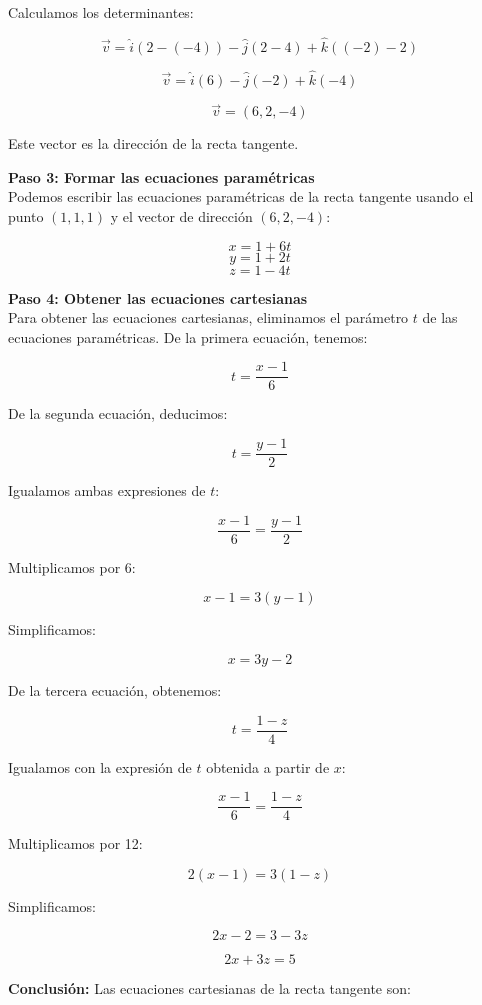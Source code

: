 \documentclass{report}
\begin{document}
    Calculamos los determinantes:

    \[
    \vec{v} = \hat{i} (2 - (-4)) - \hat{j} (2 - 4) + \hat{k} ((-2) - 2)
    \]

    \[
    \vec{v} = \hat{i} (6) - \hat{j} (-2) + \hat{k} (-4)
    \]

    \[
    \vec{v} = (6, 2, -4)
    \]

    Este vector es la dirección de la recta tangente.

    \textbf{Paso 3: Formar las ecuaciones paramétricas}\\
    Podemos escribir las ecuaciones paramétricas de la recta tangente usando el punto $(1, 1, 1)$ y el vector de dirección $(6, 2, -4)$:

    \[
    x = 1 + 6t
    \]
    \[
    y = 1 + 2t
    \]
    \[
    z = 1 - 4t
    \]

    \textbf{Paso 4: Obtener las ecuaciones cartesianas}\\
    Para obtener las ecuaciones cartesianas, eliminamos el parámetro $t$ de las ecuaciones paramétricas. De la primera ecuación, tenemos:

    \[
    t = \frac{x - 1}{6}
    \]

    De la segunda ecuación, deducimos:

    \[
    t = \frac{y - 1}{2}
    \]

    Igualamos ambas expresiones de $t$:

    \[
    \frac{x - 1}{6} = \frac{y - 1}{2}
    \]

    Multiplicamos por 6:

    \[
    x - 1 = 3(y - 1)
    \]

    Simplificamos:

    \[
    x = 3y - 2
    \]

    De la tercera ecuación, obtenemos:

    \[
    t = \frac{1 - z}{4}
    \]

    Igualamos con la expresión de $t$ obtenida a partir de $x$:

    \[
    \frac{x - 1}{6} = \frac{1 - z}{4}
    \]

    Multiplicamos por 12:

    \[
    2(x - 1) = 3(1 - z)
    \]

    Simplificamos:

    \[
    2x - 2 = 3 - 3z
    \]

    \[
    2x + 3z = 5
    \]

    \textbf{Conclusión:} Las ecuaciones cartesianas de la recta tangente son:
\end{document}

